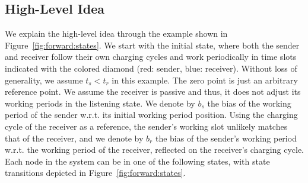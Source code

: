 \documentclass[lettersize,journal]{IEEEtran}
\begin{document}
\subsection{High-Level Idea}
\label{sec:forward:idea}
We explain the high-level idea through the example shown in Figure~\ref{fig:forward:states}. We start with the initial state, where both the sender and receiver follow their own charging cycles and work periodically in time slots indicated with the colored diamond (red: sender, blue: receiver). Without loss of generality, we assume $t_s < t_r $ in this example. The zero point is just an arbitrary reference point. We assume the receiver is passive and thus, it does not adjust its working periods in the listening state. We denote by $b_s$ the bias of the working period of the sender w.r.t. its initial working period position. Using the charging cycle of the receiver as a reference, the sender's working slot unlikely matches that of the receiver, and we denote by $b_r$ the bias of the sender's working period w.r.t. the working period of the receiver, reflected on the receiver's charging cycle. Each node in the system can be in one of the following states, with state transitions depicted in Figure~\ref{fig:forward:states}.
\end{document}
